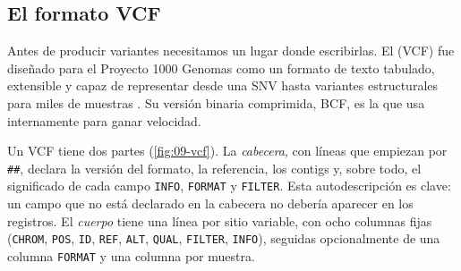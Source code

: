 \subsection{El formato VCF}

Antes de producir variantes necesitamos un lugar donde escribirlas. El  (VCF) fue diseñado para el Proyecto 1000 Genomas como un formato de texto tabulado, extensible y capaz de representar desde una SNV hasta variantes estructurales para miles de muestras \parencite{c09-danecek2011}. Su versión binaria comprimida, BCF, es la que  usa internamente para ganar velocidad.

Un VCF tiene dos partes (\cref{fig:09-vcf}). La \emph{cabecera}, con líneas que empiezan por \texttt{\#\#}, declara la versión del formato, la referencia, los contigs y, sobre todo, el significado de cada campo \texttt{INFO}, \texttt{FORMAT} y \texttt{FILTER}. Esta autodescripción es clave: un campo que no está declarado en la cabecera no debería aparecer en los registros. El \emph{cuerpo} tiene una línea por sitio variable, con ocho columnas fijas (\texttt{CHROM}, \texttt{POS}, \texttt{ID}, \texttt{REF}, \texttt{ALT}, \texttt{QUAL}, \texttt{FILTER}, \texttt{INFO}), seguidas opcionalmente de una columna \texttt{FORMAT} y una columna por muestra.

